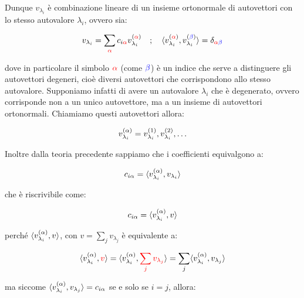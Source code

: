 	 Dunque $v_{\lambda_i}$ è combinazione lineare di un insieme ortonormale di autovettori con lo stesso autovalore $\lambda_{i}$, ovvero sia:

\begin{nb}
\begin{align*}
	v_{\lambda_i} = \sum_{\textcolor{red}{\alpha}} c_{i\textcolor{red}{\alpha}} v^{\qty(\textcolor{red}{\alpha})}_{\lambda_i} \quad ; \quad \langle v^{\qty(\textcolor{red}{\alpha})}_{\lambda_i},v^{\qty(\textcolor{blue}{\beta})}_{\lambda_i}  \rangle = \delta_{\textcolor{red}{\alpha} \textcolor{blue}{\beta}}
\end{align*}
\end{nb}
	
	dove in particolare il simbolo $\textcolor{red}{\alpha}$ (come $\textcolor{blue}{\beta}$) è un indice che serve a distinguere gli autovettori degeneri, cioè diversi autovettori che corrispondono allo stesso autovalore. Supponiamo infatti di avere un autovalore $\lambda_i$ che è degenerato, ovvero corrisponde non a un unico autovettore, ma a un insieme di autovettori ortonormali. Chiamiamo questi autovettori allora:
	
\begin{align*}
	v_{\lambda_i}^{\qty(\alpha)} = v_{\lambda_i}^{\qty(1)}, v_{\lambda_i}^{\qty(2)}, \ldots
\end{align*}

	Inoltre dalla teoria precedente sappiamo che i coefficienti equivalgono a:
	
\begin{align*}
	c_{i\alpha} = \langle v_{\lambda_i}^{\qty(\alpha)}, v_{\lambda_i} \rangle
\end{align*}

	che è riscrivibile come:
	
\begin{align*}
	c_{i\alpha} = \langle v_{\lambda_i}^{\qty(\alpha)}, v \rangle
\end{align*}

	perché $\langle v_{\lambda_i}^{\qty(\alpha)}, v \rangle$, con $v = \sum_j v_{\lambda_j}$ è equivalente a:
	
\begin{align*}
	\langle v_{\lambda_i}^{\qty(\alpha)}, \textcolor{red}{v} \rangle = \langle v_{\lambda_i}^{\qty(\alpha)}, \textcolor{red}{\sum_j v_{\lambda_j}} \rangle
= \sum_j \langle v_{\lambda_i}^{\qty(\alpha)}, v_{\lambda_j} \rangle 
\end{align*}

	ma siccome $\langle v_{\lambda_i}^{\qty(\alpha)}, v_{\lambda_j} \rangle  = c_{i\alpha}$ se e solo se $ i = j$, allora:
	
